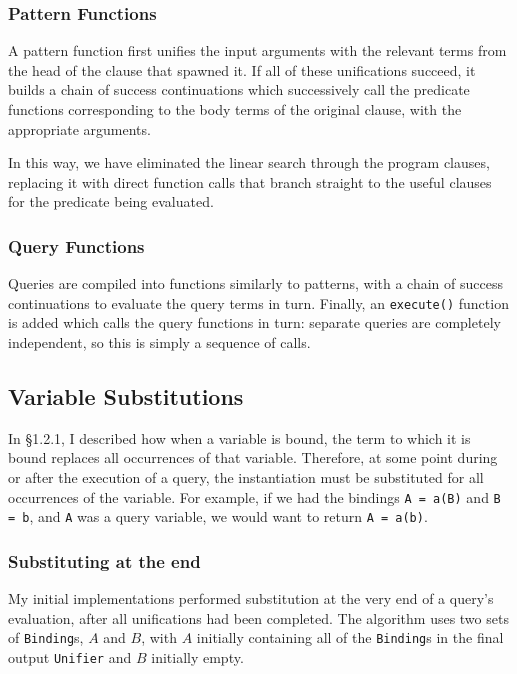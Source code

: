 \documentclass[12pt]{article}
\begin{document}
\subsubsection{Pattern Functions}

A pattern function first unifies the input arguments with the relevant terms from the head of the clause that spawned it.
If all of these unifications succeed, it builds a chain of success continuations which successively call the predicate functions corresponding to the body terms of the original clause, with the appropriate arguments.

In this way, we have eliminated the linear search through the program clauses, replacing it with direct function calls that branch straight to the useful clauses for the predicate being evaluated.


\subsubsection{Query Functions}

Queries are compiled into functions similarly to patterns, with a chain of success continuations to evaluate the query terms in turn. 
Finally, an \verb|execute()| function is added which calls the query functions in turn: separate queries are completely independent, so this is simply a sequence of calls.

\subsection{Variable Substitutions}

In \S1.2.1, I described how when a variable is bound, the term to which it is bound replaces all occurrences of that variable. 
Therefore, at some point during or after the execution of a query, the instantiation must be substituted for all occurrences of the variable. 
For example, if we had the bindings \verb|A = a(B)| and \verb|B = b|, and \verb|A| was a query variable, we would want to return \verb|A = a(b)|.

\subsubsection{Substituting at the end}

My initial implementations performed substitution at the very end of a query's evaluation, after all unifications had been completed. 
The algorithm uses two sets of \verb|Binding|s, $A$ and $B$, with $A$ initially containing all of the \verb|Binding|s in the final output \verb|Unifier| and $B$ initially empty.
\end{document}
